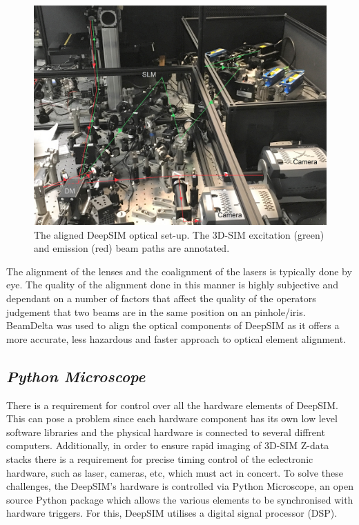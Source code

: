 \begin{figure}[h]
	\centering
	\includegraphics[width=\textwidth]{images/DeepSIM_SIM_path_annotated_bright.jpg}
	\caption{The aligned DeepSIM optical set-up. The 3D-SIM excitation (green) and emission (red) beam paths are annotated.}
	\label{fig:DeepSIM_physical_optics}
\end{figure}

The alignment of the lenses and the coalignment of the lasers is typically done by eye. The quality of the alignment done in this manner is highly subjective and dependant on a number of factors that affect the quality of the operators judgement that two beams are in the same position on an pinhole/iris. BeamDelta was used to align the optical components of DeepSIM as it offers a more accurate, less hazardous and faster approach to optical element alignment.\cite{dobbie2019beamdelta}

\subsection{\textit{Python Microscope}}
\label{subsec:microscope}

There is a requirement for control over all the hardware elements of DeepSIM. This can pose a problem since each hardware component has its own low level software libraries and the physical hardware is connected to several diffrent computers. Additionally, in order to ensure rapid imaging of 3D-SIM Z-data stacks there is a requirement for precise timing control of the eclectronic hardware, such as laser, cameras, etc, which must act in concert. To solve these challenges, the DeepSIM's hardware is controlled via Python Microscope, an open source Python package which allows the various elements to be synchronised with hardware triggers. For this, DeepSIM utilises a digital signal processor (DSP).

